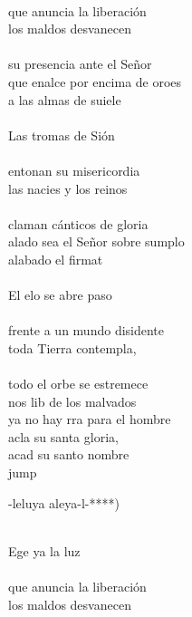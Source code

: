 \begin{cancion}
	\jump\\
que anuncia la liberación\\
	los maldos desvanecen \\
	\jump\\
su presencia ante el Señor\\
	que enalce por encima de oroes\\
	a las almas de suiele\\
	\jump\\
	Las tromas de Sión \\
	\jump\\
entonan su misericordia\\
	las nacies y los reinos \\
	\jump\\
claman cánticos de gloria\\
	alado sea el Señor sobre sumplo\\
	alabado el firmat\\
	\jump\\
	El elo se abre paso \\
	\jump\\
frente a un mundo disidente\\
	toda  Tierra contempla, \\
	\jump\\
todo el orbe se estremece\\
	nos lib de los malvados  \\
	ya no hay rra para el hombre\\
	acla su santa gloria,\\
	 acad su santo nombre\\jump\\
	\begin{chorus}%
	-leluya aleya-l-*)\\
	\end{chorus}%
	\jump\\
	Ege ya la luz \\
	\jump\\
que anuncia la liberación\\
	los maldos desvanecen \\

\end{cancion}
